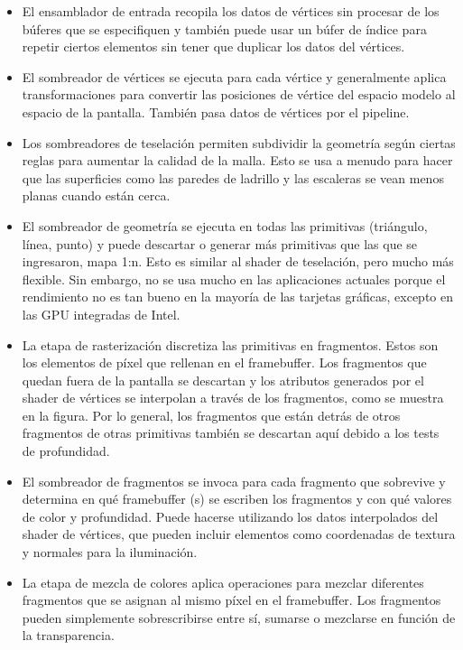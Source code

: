 \documentclass[a4paper, 17pt]{book}
\begin{document}
\begin{itemize}
  \item El ensamblador de entrada recopila los datos de vértices sin procesar de los búferes que
  se especifiquen y también puede usar un búfer de índice para repetir ciertos elementos sin tener
  que duplicar los datos del vértices.
  
  \item El sombreador de vértices se ejecuta para cada vértice y generalmente aplica transformaciones
  para convertir las posiciones de vértice del espacio modelo al espacio de la pantalla. También pasa
  datos de vértices por el pipeline.

  \item Los sombreadores de teselación permiten subdividir la geometría según ciertas reglas para aumentar
  la calidad de la malla. Esto se usa a menudo para hacer que las superficies como las paredes de ladrillo
  y las escaleras se vean menos planas cuando están cerca.

  \item El sombreador de geometría se ejecuta en todas las primitivas (triángulo, línea, punto) y puede
  descartar o generar más primitivas que las que se ingresaron, mapa 1:n. Esto es similar al shader de teselación,
  pero mucho más flexible. Sin embargo, no se usa mucho en las aplicaciones actuales porque el rendimiento no es
  tan bueno en la mayoría de las tarjetas gráficas, excepto en las GPU integradas de Intel.

  \item La etapa de rasterización discretiza las primitivas en fragmentos. Estos son los elementos de píxel
  que rellenan en el framebuffer. Los fragmentos que quedan fuera de la pantalla se descartan y los atributos
  generados por el shader de vértices se interpolan a través de los fragmentos, como se muestra en la figura.
  Por lo general, los fragmentos que están detrás de otros fragmentos de otras primitivas también se descartan
  aquí debido a los tests de profundidad.

  \item El sombreador de fragmentos se invoca para cada fragmento que sobrevive y determina en qué framebuffer (s)
  se escriben los fragmentos y con qué valores de color y profundidad. Puede hacerse utilizando los datos interpolados 
  del shader de vértices, que pueden incluir elementos como coordenadas de textura y normales para la iluminación.

  \item La etapa de mezcla de colores aplica operaciones para mezclar diferentes fragmentos que se asignan al mismo píxel
  en el framebuffer. Los fragmentos pueden simplemente sobrescribirse entre sí, sumarse o mezclarse en función de la transparencia.

\end{itemize}
\end{document}
